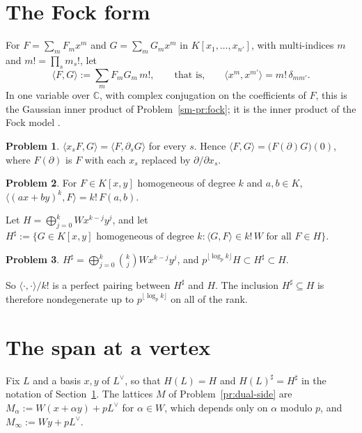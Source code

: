 \documentclass[reqno]{amsart}
\theoremstyle{definition}
\newtheorem{problem}{Problem}[section]
\theoremstyle{plain}
\newcommand{\C}{\mathbb{C}}
\begin{document}
\section{The Fock form}\label{sec:fock}

For \(F = \sum_m F_m x^m\) and \(G = \sum_m G_m x^m\) in \(K[x_1, \dots, x_{n'}]\), with multi-indices \(m\) and \(m! = \prod_s m_s!\), let
\[
  \langle F, G \rangle := \sum_m F_m G_m\, m! ,
  \qquad\text{that is,}\qquad
  \langle x^m, x^{m'} \rangle = m!\, \delta_{m m'} .
\]
In one variable over \(\C\), with complex conjugation on the coefficients of \(F\), this is the Gaussian inner product of Problem~\ref{sm-pr:fock}; it is the inner product of the Fock model \cite{Ba}.

\begin{problem}\label{pr:fock-adj}
\(\langle x_s F, G \rangle = \langle F, \partial_s G \rangle\) for every \(s\).  Hence \(\langle F, G \rangle = \bigl(F(\partial) G\bigr)(0)\), where \(F(\partial)\) is \(F\) with each \(x_s\) replaced by \(\partial/\partial x_s\).
\end{problem}

\begin{problem}\label{pr:fock-power}
For \(F \in K[x, y]\) homogeneous of degree \(k\) and \(a, b \in K\), \(\langle (ax + by)^k, F \rangle = k!\, F(a, b)\).
\end{problem}

Let \(H = \bigoplus_{j=0}^k W x^{k-j} y^j\), and let \(H^\sharp := \{G \in K[x,y] \text{ homogeneous of degree } k : \langle G, F \rangle \in k!\, W \text{ for all } F \in H\}\).

\begin{problem}\label{pr:fock-dual}
\(H^\sharp = \bigoplus_{j=0}^k \binom kj W x^{k-j} y^j\), and \(p^{\lfloor \log_p k \rfloor} H \subset H^\sharp \subset H\).
\end{problem}

So \(\langle \cdot, \cdot \rangle / k!\) is a perfect pairing between \(H^\sharp\) and \(H\).  The inclusion \(H^\sharp \subseteq H\) is therefore nondegenerate up to \(p^{\lfloor \log_p k \rfloor}\) on all of the rank.

\section{The span at a vertex}\label{sec:vertex}

Fix \(L\) and a basis \(x, y\) of \(L^\vee\), so that \(H(L) = H\) and \(H(L)^\sharp = H^\sharp\) in the notation of Section~\ref{sec:fock}.  The lattices \(M\) of Problem~\ref{pr:dual-side} are \(M_\alpha := W(x + \alpha y) + pL^\vee\) for \(\alpha \in W\), which depends only on \(\alpha\) modulo \(p\), and \(M_\infty := Wy + pL^\vee\).
\end{document}
